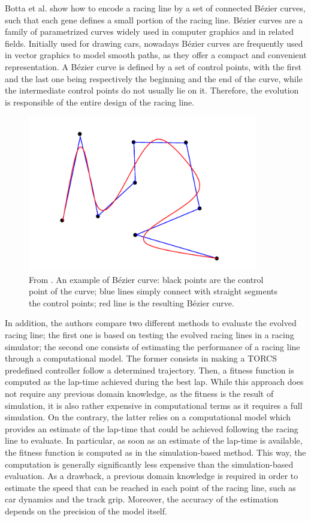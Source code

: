 Botta et al. \cite{botta} show how to encode a racing line by a set of connected B\'{e}zier curves, such that each gene defines a small portion of the racing line. B\'{e}zier curves are a family of parametrized curves widely used in computer graphics and in related fields. Initially used for drawing cars, nowadays B\'{e}zier curves are frequently used in vector graphics to model smooth paths, as they offer a compact and convenient representation.
A B\'{e}zier curve is defined by a set of control points, with the first and the last one being respectively the beginning and the end of the curve, while the intermediate control points do not usually lie on it. Therefore, the evolution is responsible of the entire design of the racing line.  
  \begin{figure}
    \centering
 	  \captionsetup{width=10cm}
      \includegraphics[width=10cm]{./img/bezier}
     \caption{From \cite{botta}. An example of B\'{e}zier curve: black points are the control point of the curve; blue lines simply connect with straight segments the control points; red line is the resulting B\'{e}zier curve.}
  \end{figure}
In addition, the authors compare two different methods to evaluate the evolved racing line; the first one is based on testing the evolved racing lines in a racing simulator; the second one consists of estimating the performance of a racing line through a computational model.
The former consists in making a TORCS predefined controller follow a determined trajectory. Then, a fitness function is computed as the lap-time achieved during the best lap. While this approach does not require any previous domain knowledge, as the fitness is the result of simulation, it is also rather expensive in computational terms as it requires a full simulation. 
On the contrary, the latter relies on a computational model which provides an estimate of the lap-time
that could be achieved following the racing line to evaluate. In particular, as soon as an estimate of the lap-time is available, the fitness function is computed as in the simulation-based method. This way, the computation is generally significantly less expensive than the simulation-based evaluation. As a drawback, a previous domain knowledge is required in order to estimate the speed that can be reached in each point of the racing line, such as car dynamics and the track grip. Moreover, the accuracy of the estimation depends on the precision of the model itself.

